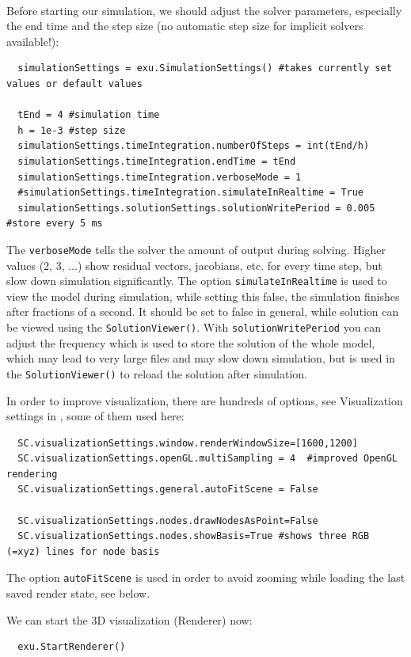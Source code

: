 \horizontalRuler\\
\noindent Before starting our simulation, we should adjust the solver parameters, especially the end time and the step size (no automatic step size for implicit solvers available!):
\pythonstyle\begin{lstlisting}
  simulationSettings = exu.SimulationSettings() #takes currently set values or default values

  tEnd = 4 #simulation time
  h = 1e-3 #step size
  simulationSettings.timeIntegration.numberOfSteps = int(tEnd/h)
  simulationSettings.timeIntegration.endTime = tEnd
  simulationSettings.timeIntegration.verboseMode = 1
  #simulationSettings.timeIntegration.simulateInRealtime = True
  simulationSettings.solutionSettings.solutionWritePeriod = 0.005 #store every 5 ms
\end{lstlisting}
The \texttt{verboseMode} tells the solver the amount of output during solving. Higher values (2, 3, ...) show residual vectors, jacobians, etc. for every time step, but slow down simulation significantly.
The option \texttt{simulateInRealtime} is used to view the model during simulation, while setting this false, 
the simulation finishes after fractions of a second. It should be set to false in general, 
while solution can be viewed using the \texttt{SolutionViewer()}.
With \texttt{solutionWritePeriod} you can adjust the frequency which is used to store the solution of the whole model, 
which may lead to very large files and may slow down simulation, but is used in the \texttt{SolutionViewer()} to reload the solution after simulation.

\noindent In order to improve visualization, there are hundreds of options, see Visualization settings in , some of them used here:
\pythonstyle\begin{lstlisting}
  SC.visualizationSettings.window.renderWindowSize=[1600,1200]
  SC.visualizationSettings.openGL.multiSampling = 4  #improved OpenGL rendering
  SC.visualizationSettings.general.autoFitScene = False

  SC.visualizationSettings.nodes.drawNodesAsPoint=False
  SC.visualizationSettings.nodes.showBasis=True #shows three RGB (=xyz) lines for node basis
\end{lstlisting}
The option \texttt{autoFitScene} is used in order to avoid zooming while loading the last saved render state, see below.

\noindent We can start the 3D visualization (Renderer) now:
\pythonstyle\begin{lstlisting}
  exu.StartRenderer()
\end{lstlisting}

